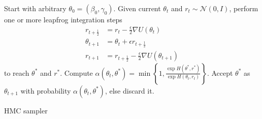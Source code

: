 \begin{algorithm}[!ht]
\begin{algorithmic}[1]
\State Start with arbitrary $\theta_0 = (\beta _0, \gamma _0)$.
  \State Given current $\theta_t$ and $r_t \sim \mathcal{N}(0, I)$, perform one or more leapfrog integration
  steps 
  \begin{align*}
  r_{t + \frac{1}{2}} &= r_t - \frac{\epsilon}{2}\nabla U(\theta_t) \\
   \theta_{t+ 1} &= \theta_t + \epsilon  r_{t + \frac{1}{2}} \\
   r_{t + 1} &= r_{t + \frac{1}{2}} - \frac{\epsilon}{2}\nabla U(\theta_{t+ 1})
    \end{align*}
    to reach  $\theta^*$ and $r^*$.
    \State Compute $\alpha(\theta_t, \theta^*) = \min \left\{ 1, \frac{\exp H(\theta^*, r^*)}{\exp H(\theta_t, r_t)} \right\} $.
   \State Accept $\theta^*$ as $\theta_{t+1}$ with probability $\alpha(\theta_t, \theta^*)$, else discard it. 
  
 \EndWhile
 \end{algorithmic}
 \caption{HMC sampler}\label{alg:hmc}
\end{algorithm}





